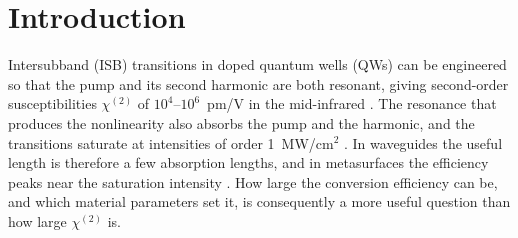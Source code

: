 \documentclass[11pt]{article}
\newcommand{\chitwo}{\chi^{(2)}}
\begin{document}
\section{Introduction}
Intersubband (ISB) transitions in doped quantum wells (QWs) can be engineered so that the pump and its second harmonic are both resonant, giving second-order susceptibilities $\chitwo$ of $10^4$--$10^6$~pm/V in the mid-infrared \cite{Rosencher1991,Rosencher1996,Vurgaftman2021,Fejer1989}. The resonance that produces the nonlinearity also absorbs the pump and the harmonic, and the transitions saturate at intensities of order 1~MW/cm$^2$ \cite{Boucaud1991,Heyman1994,Jeannin2021}. In waveguides the useful length is therefore a few absorption lengths, and in metasurfaces the efficiency peaks near the saturation intensity \cite{GomezDiaz2015,Lee2014,Nookala2016,Krakofsky2025}. How large the conversion efficiency can be, and which material parameters set it, is consequently a more useful question than how large $\chitwo$ is.
\end{document}
